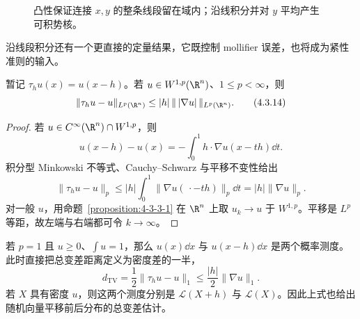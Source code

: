 \begin{figure}[htbp]
  \centering
  \caption{凸性保证连接 $x,y$ 的整条线段留在域内；沿线积分并对 $y$ 平均产生可积势核。}
  \label{fig:4-3-3-poincare-segments}
\end{figure}

沿线段积分还有一个更直接的定量结果，它既控制 mollifier 误差，也将成为紧性准则的输入。

\begin{proposition}[平移估计]\label{proposition:4-3-3-3}
暂记 $\tau_hu(x)=u(x-h)$。若 $u\in W^{1,p}(\R^n)$、$1\leq p<\infty$，则
\[
 \|\tau_hu-u\|_{L^p(\R^n)}
 \leq |h|\,\|\,|\nabla u|\,\|_{L^p(\R^n)}.
 \tag{4.3.14}\label{eq:4-3-translation-estimate}
\]
\end{proposition}

\begin{proof}
若 $u\in C^\infty(\R^n)\cap W^{1,p}$，则
\[
 u(x-h)-u(x)=-\int_0^1h\cdot\nabla u(x-th)\dd t.
\]
积分型 Minkowski 不等式、Cauchy--Schwarz 与平移不变性给出
\[
 \|\tau_hu-u\|_p
 \leq |h|\int_0^1\|\nabla u(\,\cdot-th)\|_p\dd t
 =|h|\|\nabla u\|_p.
\]
对一般 $u$，用命题~\ref{proposition:4-3-3-1} 在 $\R^n$ 上取
$u_k\to u$ 于 $W^{1,p}$。平移是 $L^p$ 等距，故左端与右端都可令 $k\to\infty$。
\end{proof}

若 $p=1$ 且 $u\geq0$、$\int u=1$，那么 $u(x)\dd x$ 与
$u(x-h)\dd x$ 是两个概率测度。此时直接把总变差距离定义为密度差的一半，
\[
 d_{\mathrm{TV}}
 =\frac12\|\tau_hu-u\|_1
 \leq\frac{|h|}{2}\|\nabla u\|_1.
\]
若 $X$ 具有密度 $u$，则这两个测度分别是 $\mathcal L(X+h)$ 与 $\mathcal L(X)$。因此上式也给出
随机向量平移前后分布的总变差估计。

